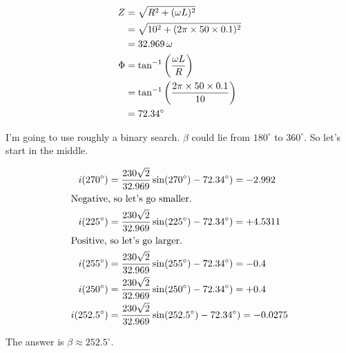 \subsection{}

\begin{align*}
Z & = \sqrt{R^2 + (\omega L)^2} \\
  & = \sqrt{10^2 + (2\pi \times 50 \times  0.1)^2} \\
  & = \unit[32.969]{\omega} \\
\Phi & = \tan^{-1}\left(\frac{\omega L}{R}\right) \\
     & = \tan^{-1}\left(\frac{2\pi \times 50 \times 0.1}{10}\right) \\
     & = 72.34^\circ
\end{align*}

I'm going to use roughly a binary search.
$\beta$ could lie from $180^\circ$ to $360^\circ$. So let's start in the middle.

\begin{align*}
i(270^\circ) & = \frac{230\sqrt{2}}{32.969} \sin(270^\circ) - 72.34^\circ) = -2.992 \\
\intertext{Negative, so let's go smaller.}
i(225^\circ) & = \frac{230\sqrt{2}}{32.969} \sin(225^\circ) - 72.34^\circ) = +4.5311 \\
\intertext{Positive, so let's go larger.}
i(255^\circ) & = \frac{230\sqrt{2}}{32.969} \sin(255^\circ) - 72.34^\circ) = -0.4 \\
i(250^\circ) & = \frac{230\sqrt{2}}{32.969} \sin(250^\circ) - 72.34^\circ) = +0.4 \\
i(252.5^\circ) & = \frac{230\sqrt{2}}{32.969} \sin(252.5^\circ) - 72.34^\circ) = -0.0275 \\
\end{align*}

The answer is $\beta \approx 252.5^\circ$.